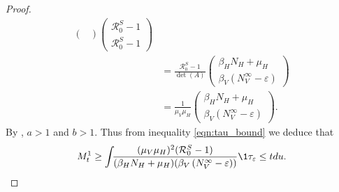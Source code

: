 \begin{proof}
\begin{equation}
\begin{aligned}
\begin{pmatrix}
            \end{pmatrix}
            \begin{pmatrix}
                \mathcal{R}_0 ^ S - 1
                \\
                \mathcal{R}_0 ^ S - 1
            \end{pmatrix}
            \\
            & =
            \frac{\mathcal{R}_0 ^ S - 1}{\det(A)}
            \begin{pmatrix}
                \beta_H N_H + \mu_H
                \\
                \beta_V \left(N_V ^ {\infty} -\varepsilon\right)
            \end{pmatrix}
            \\
            & =
            \frac{1}{\mu_V \mu_H}
            \begin{pmatrix}
                \beta_H N_H + \mu_H
                \\
                \beta_V \left(N_V ^ {\infty} -\varepsilon\right)
            \end{pmatrix}.
        \end{aligned}
    \end{equation}
%
%
%
%
    By , $a>1$ and $b>1$. Thus from inequality
    \eqref{eqn:tau_bound} we deduce that
    \begin{equation} \label{eqn:T1_equivalence}
        M_t ^ 1 \geq 
        \int_{}
        \dfrac{
            (\mu_V \mu_H) ^ 2 (\mathcal{R}_0 ^ S - 1)
        }{
            (\beta_H N_H + \mu_H) 
            (\beta_V \left(N_V ^ {\infty} -\varepsilon\right))
        }
        \1{\tau_\varepsilon \leq t}
         du.
    \end{equation}
    

\end{proof}
